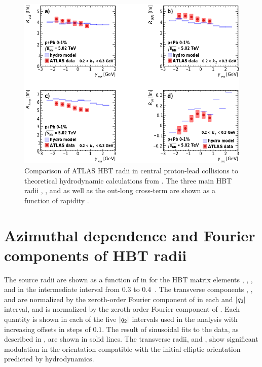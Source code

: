 \begin{figure}[t]
\centering
\includegraphics[width=\linewidth]{theory_bozek_kys.png}
\caption{Comparison of ATLAS HBT radii in central proton-lead collisions to theoretical hydrodynamic calculations from . The three main HBT radii \Rout, \Rside, and \Rlong as well as the out-long cross-term \Rol are shown as a function of rapidity \kys.}
\label{fig:results_theory_kys}
\end{figure}

\FloatBarrier
\section{Azimuthal dependence and Fourier components of HBT radii}

The source radii are shown as a function of \tdpk in \Fig{\ref{fig:Rosl_vs_phi}} for the HBT matrix elements \Rout, \Rside, \Rlong, and \Ros in the intermediate \kt interval from 0.3 to 0.4\ \GeV.
The transverse components \Rout, \Rside, and \Ros are normalized by the zeroth-order Fourier component of \Rside in each \kt and $|q_{2}|$ interval, and \Rlong is normalized by the zeroth-order Fourier component of \Rlong.
Each quantity is shown in each of the five $|q_{2}|$ intervals used in the analysis with increasing offsets in steps of $0.1$.
The result of sinusoidal fits to the data, as described in \Sect{\ref{subsec:azi_correlations}}, are shown in solid lines.
The transverse radii, \Rout and \Rside, show significant modulation in the orientation compatible with the initial elliptic orientation predicted by hydrodynamics.


